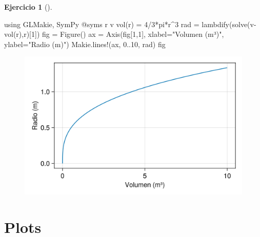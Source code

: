 \documentclass[
  a4paper,
]{scrreport}
\newenvironment{Shaded}{\begin{snugshade}}{\end{snugshade}}
\newcommand{\BuiltInTok}[1]{\textcolor[rgb]{0.00,0.23,0.31}{#1}}
\newcommand{\ConstantTok}[1]{\textcolor[rgb]{0.56,0.35,0.01}{#1}}
\newcommand{\FloatTok}[1]{\textcolor[rgb]{0.68,0.00,0.00}{#1}}
\newcommand{\FunctionTok}[1]{\textcolor[rgb]{0.28,0.35,0.67}{#1}}
\newcommand{\ImportTok}[1]{\textcolor[rgb]{0.00,0.46,0.62}{#1}}
\newcommand{\NormalTok}[1]{\textcolor[rgb]{0.00,0.23,0.31}{#1}}
\newcommand{\OperatorTok}[1]{\textcolor[rgb]{0.37,0.37,0.37}{#1}}
\newcommand{\PreprocessorTok}[1]{\textcolor[rgb]{0.68,0.00,0.00}{#1}}
\newcommand{\StringTok}[1]{\textcolor[rgb]{0.13,0.47,0.30}{#1}}
\theoremstyle{definition}
\newtheorem{exercise}{Ejercicio}[chapter]
\theoremstyle{remark}
\begin{document}
\begin{exercise}[]
\begin{tcolorbox}
\begin{Shaded}
\begin{Highlighting}[]
\ImportTok{using} \BuiltInTok{GLMakie}\NormalTok{, }\BuiltInTok{SymPy}
\PreprocessorTok{@syms}\NormalTok{ r v}
\FunctionTok{vol}\NormalTok{(r) }\OperatorTok{=} \FloatTok{4}\OperatorTok{/}\FloatTok{3}\OperatorTok{*}\ConstantTok{pi}\OperatorTok{*}\NormalTok{r}\OperatorTok{\^{}}\FloatTok{3}
\NormalTok{rad }\OperatorTok{=} \FunctionTok{lambdify}\NormalTok{(}\FunctionTok{solve}\NormalTok{(}\FunctionTok{v{-}vol}\NormalTok{(r),r)[}\FloatTok{1}\NormalTok{])}
\NormalTok{fig }\OperatorTok{=} \FunctionTok{Figure}\NormalTok{()}
\NormalTok{ax }\OperatorTok{=} \FunctionTok{Axis}\NormalTok{(fig[}\FloatTok{1}\NormalTok{,}\FloatTok{1}\NormalTok{], xlabel}\OperatorTok{=}\StringTok{"Volumen (m³)"}\NormalTok{, ylabel}\OperatorTok{=}\StringTok{"Radio (m)"}\NormalTok{)}
\NormalTok{Makie.}\FunctionTok{lines!}\NormalTok{(ax, }\FloatTok{0}\OperatorTok{..}\FloatTok{10}\NormalTok{, rad)}
\NormalTok{fig}
\end{Highlighting}
\end{Shaded}

\begin{figure}[H]

{\centering \includegraphics{03-funciones-elementales_files/figure-pdf/cell-13-output-1.png}

}

\end{figure}

\section{Plots}


\end{tcolorbox}
\end{exercise}
\end{document}
